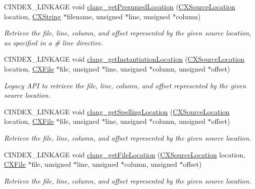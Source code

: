 \begin{DoxyCompactItemize}
C\+I\+N\+D\+E\+X\+\_\+\+L\+I\+N\+K\+A\+GE void \hyperlink{group__CINDEX__LOCATIONS_ga03508d9c944feeb3877515a1b08d36f9}{clang\+\_\+get\+Presumed\+Location} (\hyperlink{structCXSourceLocation}{C\+X\+Source\+Location} location, \hyperlink{structCXString}{C\+X\+String} $\ast$filename, unsigned $\ast$line, unsigned $\ast$column)
\begin{DoxyCompactList}\small\item\em Retrieve the file, line, column, and offset represented by the given source location, as specified in a \# line directive. \end{DoxyCompactList}\item 
C\+I\+N\+D\+E\+X\+\_\+\+L\+I\+N\+K\+A\+GE void \hyperlink{group__CINDEX__LOCATIONS_ga112e657eb04c281ca12c6975d489b633}{clang\+\_\+get\+Instantiation\+Location} (\hyperlink{structCXSourceLocation}{C\+X\+Source\+Location} location, \hyperlink{group__CINDEX__FILES_gacfcea9c1239c916597e2e5b3e109215a}{C\+X\+File} $\ast$file, unsigned $\ast$line, unsigned $\ast$column, unsigned $\ast$offset)
\begin{DoxyCompactList}\small\item\em Legacy A\+PI to retrieve the file, line, column, and offset represented by the given source location. \end{DoxyCompactList}\item 
C\+I\+N\+D\+E\+X\+\_\+\+L\+I\+N\+K\+A\+GE void \hyperlink{group__CINDEX__LOCATIONS_ga01f1a342f7807ea742aedd2c61c46fa0}{clang\+\_\+get\+Spelling\+Location} (\hyperlink{structCXSourceLocation}{C\+X\+Source\+Location} location, \hyperlink{group__CINDEX__FILES_gacfcea9c1239c916597e2e5b3e109215a}{C\+X\+File} $\ast$file, unsigned $\ast$line, unsigned $\ast$column, unsigned $\ast$offset)
\begin{DoxyCompactList}\small\item\em Retrieve the file, line, column, and offset represented by the given source location. \end{DoxyCompactList}\item 
C\+I\+N\+D\+E\+X\+\_\+\+L\+I\+N\+K\+A\+GE void \hyperlink{group__CINDEX__LOCATIONS_gae0ee9ff0ea04f2446832fc12a7fd2ac8}{clang\+\_\+get\+File\+Location} (\hyperlink{structCXSourceLocation}{C\+X\+Source\+Location} location, \hyperlink{group__CINDEX__FILES_gacfcea9c1239c916597e2e5b3e109215a}{C\+X\+File} $\ast$file, unsigned $\ast$line, unsigned $\ast$column, unsigned $\ast$offset)
\begin{DoxyCompactList}\small\item\em Retrieve the file, line, column, and offset represented by the given source location. \end{DoxyCompactList}\item 

\end{DoxyCompactItemize}
